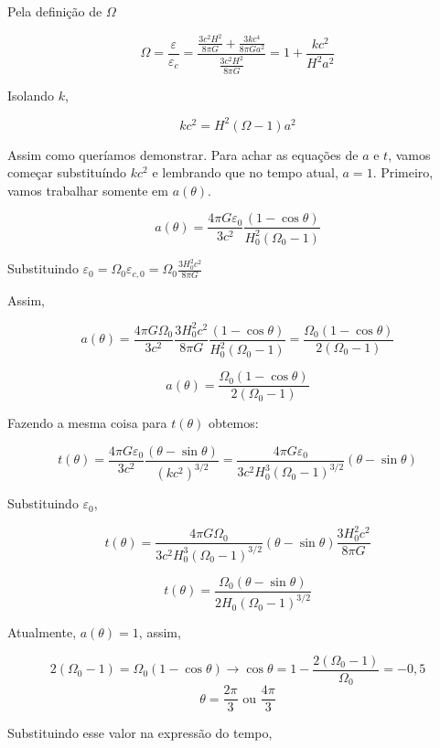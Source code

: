 \documentclass[11pt]{article}
\begin{document}
\begin{pproblem}
\begin{pssolution*}{}{}
    \begin{alternativas}
        \item Pela definição de $\Omega$

        \[\Omega = \frac{\varepsilon}{\varepsilon_c} = \frac{\frac{3c^2 H^2}{8\pi G} + \frac{3kc^4}{8\pi Ga^2}}{\frac{3c^2H^2}{8\pi G}} = 1 + \frac{kc^2}{H^2a^2}\]

        Isolando \(k\), 

        \[\boxed{kc^2 = H^2(\Omega -1)a^2}\]

        Assim como queríamos demonstrar. Para achar as equações de \(a\) e \(t\), vamos começar substituíndo \(kc^2\) e lembrando que no tempo atual, \(a=1\). Primeiro, vamos trabalhar somente em \(a(\theta)\).

        \[a(\theta) = \frac{4\pi G \varepsilon_0}{3c^2}\frac{(1-\cos\theta)}{H_0^2(\Omega_0-1)}\]

        Substituindo \(\varepsilon_0 = \Omega_0 \varepsilon_{c,0} = \Omega_0\frac{3H_0^2c^2}{8\pi G}\)

        Assim, 

        \[a(\theta) = \frac{4\pi G \Omega_0}{3c^2}\frac{3H_0^2c^2}{8\pi G}\frac{(1-\cos\theta)}{H_0^2(\Omega_0-1)} = \frac{\Omega_0(1-\cos\theta)}{2(\Omega_0-1)}\]

        \[\boxed{a(\theta) = \frac{\Omega_0(1-\cos\theta)}{2(\Omega_0-1)}}\]
        
        Fazendo a mesma coisa para \(t(\theta)\) obtemos: 

        \[t(\theta) = \frac{4\pi G\varepsilon_0 }{3c^2}\frac{(\theta-\sin\theta)}{(kc^2)^{3/2}} = \frac{4\pi G \varepsilon_0}{3c^2H_0^3(\Omega_0-1)^{3/2}}(\theta-\sin\theta)\]

        Substituindo \(\varepsilon_0\), 

        \[t(\theta) = \frac{4\pi  G\Omega_0}{3c^2H_0^3(\Omega_0-1)^{3/2}}(\theta-\sin\theta)\frac{3H_0^2c^2}{8\pi G}\]

        \[\boxed{t(\theta) = \frac{\Omega_0(\theta-\sin\theta)}{2H_0(\Omega_0-1)^{3/2}}}\]

        
        \item Atualmente, \(a(\theta)=1\), assim, 
        
        \[2(\Omega_0-1) = \Omega_0(1-\cos\theta) \rightarrow \cos\theta = 1 -\frac{2(\Omega_0-1)}{\Omega_0} = -0,5\]
        \[\theta = \frac{2\pi}{3} \text{ ou }\frac{4\pi}{3}\]

        Substituindo esse valor na expressão do tempo, 


\end{alternativas}
\end{pssolution*}
\end{pproblem}
\end{document}
